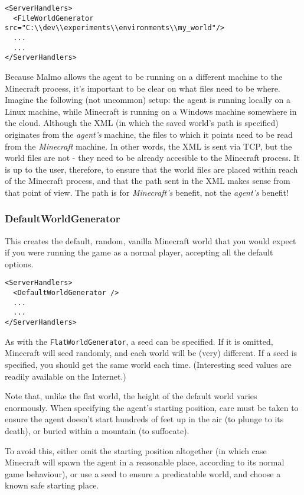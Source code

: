 \documentclass[11pt]{article} %
\begin{document}
\begin{lstlisting}[frame=lines]
<ServerHandlers>
  <FileWorldGenerator src="C:\\dev\\experiments\\environments\\my_world"/>
  ...
  ...
</ServerHandlers>
\end{lstlisting}

\begin{mdframed}[style=tipFrame]
Because Malmo allows the agent to be running on a different machine to the Minecraft process, it's important to be clear on what files need to be where. Imagine the following (not uncommon) setup: the agent is running locally on a Linux machine, while Minecraft is running on a Windows machine somewhere in the cloud. Although the XML (in which the saved world's path is specified) originates from the \emph{agent's} machine, the files to which it points need to be read from the \emph{Minecraft} machine. In other words, the XML is sent via TCP, but the world files are not - they need to be already accesible to the Minecraft process. It is up to the user, therefore, to ensure that the world files are placed within reach of the Minecraft process, and that the path sent in the XML makes sense from that point of view. The path is for \emph{Minecraft's} benefit, not the \emph{agent's} benefit!
\end{mdframed}


\subsubsection{DefaultWorldGenerator}

This creates the default, random, vanilla Minecraft world that you would expect if you were running the game as a normal player, accepting all the default options.

\begin{lstlisting}[frame=lines]
<ServerHandlers>
  <DefaultWorldGenerator />
  ...
  ...
</ServerHandlers>
\end{lstlisting}

As with the \lstinline!FlatWorldGenerator!, a seed can be specified. If it is omitted, Minecraft will seed randomly, and each world will be (very) different. If a seed is specified, you should get the same world each time. (Interesting seed values are readily available on the Internet.)

\begin{mdframed}[style=tipFrame]
Note that, unlike the flat world, the height of the default world varies enormously. When specifying the agent's starting position, care must be taken to ensure the agent doesn't start hundreds of feet up in the air (to plunge to its death), or buried within a mountain (to suffocate).

To avoid this, either omit the starting position altogether (in which case Minecraft will spawn the agent in a reasonable place, according to its normal game behaviour), or use a seed to ensure a predicatable world, and choose a known safe starting place.
\end{mdframed}
\end{document}
